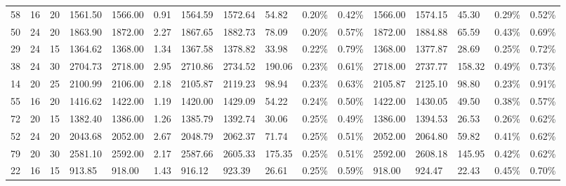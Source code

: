 \begin{longtable}{l|ll|lll|lllll|lllll}
   58 & 16                         & 20                         & 1561.50                   & 1566.00     & 0.91                & 1564.59 & 1572.64 & 54.82  & 0.20\%  & 0.42\% & 1566.00 & 1574.15 & 45.30  & 0.29\%  & 0.52\% \\
   50 & 24                         & 20                         & 1863.90                   & 1872.00     & 2.27                & 1867.65 & 1882.73 & 78.09  & 0.20\%  & 0.57\% & 1872.00 & 1884.88 & 65.59  & 0.43\%  & 0.69\% \\
   29 & 24                         & 15                         & 1364.62                   & 1368.00     & 1.34                & 1367.58 & 1378.82 & 33.98  & 0.22\%  & 0.79\% & 1368.00 & 1377.87 & 28.69  & 0.25\%  & 0.72\% \\
   38 & 24                         & 30                         & 2704.73                   & 2718.00     & 2.95                & 2710.86 & 2734.52 & 190.06 & 0.23\%  & 0.61\% & 2718.00 & 2737.77 & 158.32 & 0.49\%  & 0.73\% \\
   14 & 20                         & 25                         & 2100.99                   & 2106.00     & 2.18                & 2105.87 & 2119.23 & 98.94  & 0.23\%  & 0.63\% & 2105.87 & 2125.10 & 98.80  & 0.23\%  & 0.91\% \\
   55 & 16                         & 20                         & 1416.62                   & 1422.00     & 1.19                & 1420.00 & 1429.09 & 54.22  & 0.24\%  & 0.50\% & 1422.00 & 1430.05 & 49.50  & 0.38\%  & 0.57\% \\
   72 & 20                         & 15                         & 1382.40                   & 1386.00     & 1.26                & 1385.79 & 1392.74 & 30.06  & 0.25\%  & 0.49\% & 1386.00 & 1394.53 & 26.53  & 0.26\%  & 0.62\% \\
   52 & 24                         & 20                         & 2043.68                   & 2052.00     & 2.67                & 2048.79 & 2062.37 & 71.74  & 0.25\%  & 0.51\% & 2052.00 & 2064.80 & 59.82  & 0.41\%  & 0.62\% \\
   79 & 20                         & 30                         & 2581.10                   & 2592.00     & 2.17                & 2587.66 & 2605.33 & 175.35 & 0.25\%  & 0.51\% & 2592.00 & 2608.18 & 145.95 & 0.42\%  & 0.62\% \\
   22 & 16                         & 15                         & 913.85                    & 918.00      & 1.43                & 916.12  & 923.39  & 26.61  & 0.25\%  & 0.59\% & 918.00  & 924.47  & 22.43  & 0.45\%  & 0.70\% \\

\end{longtable}
